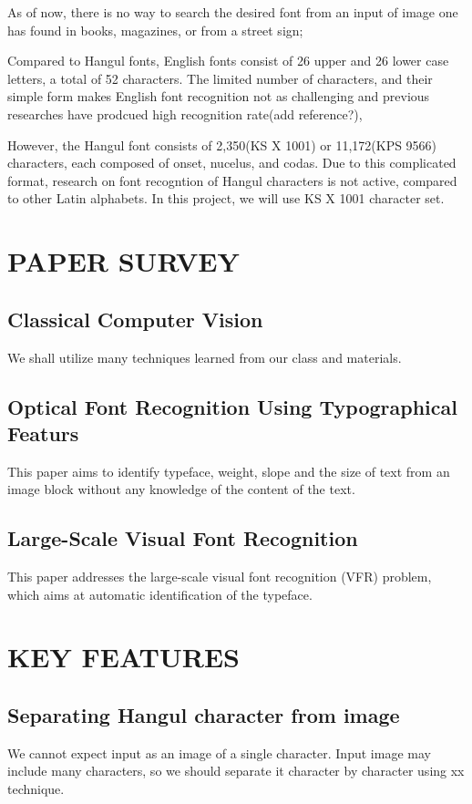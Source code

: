 \documentclass[%
 reprint,
nofootinbib,
nobibnotes,
amsmath,amssymb,
aps,
]{revtex4-1}
\begin{document}
As of now, there is no way to search the desired font from an input of image one has found in books,
magazines, or from a street sign;

Compared to Hangul fonts, English fonts consist of 26 upper and 26 lower case
letters, a total of 52 characters. The limited number of characters, and their
simple form makes English font recognition not as challenging and previous
researches have prodcued high recognition rate(add reference?),

However, the Hangul font consists of 2,350(KS X 1001) or 11,172(KPS 9566)
characters, each composed of onset, nucelus, and codas. Due to this complicated
format, research on font recogntion of Hangul characters is not active, compared to other Latin alphabets.
In this project, we will use KS X 1001 character set.


\section{\label{sec:level1}PAPER SURVEY}

\subsection{\label{sec:level2}Classical Computer Vision}
We shall utilize many techniques learned from our class and materials.

\subsection{\label{sec:level2}Optical Font Recognition Using Typographical
Featurs}
This paper\cite{zramdini} aims to identify typeface, weight, slope and the size of
text from an image block without any knowledge of the content of the text.

\subsection{\label{sec:level2}Large-Scale Visual Font Recognition}
This paper\cite{chen} addresses the large-scale visual font recognition (VFR)
problem, which aims at automatic identification of the typeface.

\section{\label{sec:level2}KEY FEATURES}
\subsection{\label{sec:level3} Separating Hangul character from image}
We cannot expect input as an image of a single character.
Input image may include many characters, so we should separate it
character by character using xx technique.
\end{document}
